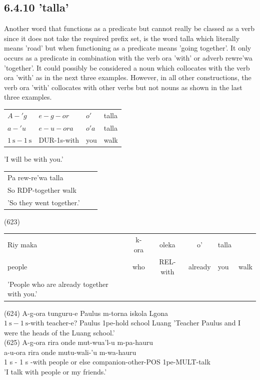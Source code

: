 \documentclass[10pt]{article}
\begin{document}
\subsection*{6.4.10 'talla'}
Another word that functions as a predicate but cannot really be classed as a verb since it does not take the required prefix set, is the word talla which literally means 'road' but when functioning as a predicate means 'going together'. It only occurs as a predicate in combination with the verb ora 'with' or adverb rewre'wa 'together'. It could possibly be considered a noun which collocates with the verb ora 'with' as in the next three examples. However, in all other constructions, the verb ora 'with' collocates with other verbs but not nouns as shown in the last three examples.

\begin{center}
\begin{tabular}{llll}
\(A-' g\) & \(e-g-o r\) & \(o '\) & talla \\
\(a-' u\) & \(e-u-o r a\) & \(o ' a\) & talla \\
\(1 \mathrm{~s}-1 \mathrm{~s}\) & DUR-1s-with & you & walk \\
\end{tabular}
\end{center}

'I will be with you.'

\begin{center}
\begin{tabular}{lcr}
Pa rew-re'wa talla &  \\
So RDP-together walk &  \\
'So they went together.' &  \\
\end{tabular}
\end{center}

(623)

\begin{center}
\begin{tabular}{lcccll}
Riy maka & k-ora & oleka & o' & talla &  \\
people & who & REL-with & already & you & walk \\
'People who are already together with you.' &  &  &  &  &  \\
\end{tabular}
\end{center}

(624) A-g-ora tunguru-e Paulus m-torna iskola Lgona\\
\(1 \mathrm{~s}-1 \mathrm{~s}\)-with teacher-e? Paulus 1pe-hold school Luang 'Teacher Paulus and I were the heads of the Luang school.'\\
(625) A-g-ora rira onde mut-wua'l-u m-pa-hauru\\
a-u-ora rira onde mutu-wali-'u m-wa-hauru\\
1 s - 1 s -with people or else companion-other-POS 1pe-MULT-talk\\
'I talk with people or my friends.'
\end{document}
